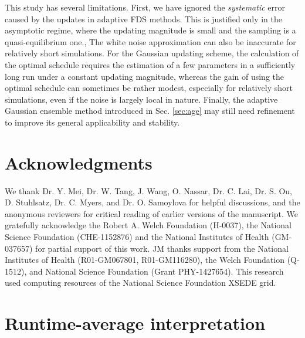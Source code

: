 \documentclass[reprint, superscriptaddress, floatfix]{revtex4-1}
\begin{document}
This study has several limitations.
%
First, we have ignored the \emph{systematic}
error\cite{zhou2005, morozov2007, zhou2008}
caused by the updates in adaptive FDS methods.
%
This is justified only in the asymptotic regime,
where the updating magnitude is small
and the sampling is a quasi-equilibrium one.\cite{
  zhou2005, morozov2007, zhou2008, barducci2008, dama2014},
%
The white noise approximation
can also be inaccurate for relatively short simulations.
%
For the Gaussian updating scheme,
the calculation of the optimal schedule requires
the estimation of a few parameters
in a sufficiently long run
under a constant updating magnitude,
whereas the gain of using the optimal schedule
can sometimes be rather modest,
especially for relatively short simulations,
even if the noise is largely local in nature.
%
Finally, the adaptive Gaussian ensemble method
introduced in Sec. \ref{sec:age} may still need refinement
to improve its general applicability and stability.


\section{Acknowledgments}

We thank Dr. Y. Mei, Dr. W. Tang, J. Wang,
O. Nassar, Dr. C. Lai, Dr. S. Ou, D. Stuhlsatz,
Dr. C. Myers, and Dr. O. Samoylova
for helpful discussions,
and the anonymous reviewers for critical reading
of earlier versions of the manuscript.
%
We gratefully acknowledge the Robert A. Welch Foundation (H-0037),
the National Science Foundation (CHE-1152876)
and the National Institutes of Health (GM-037657)
for partial support of this work.
%
JM thanks support from the National Institutes of Health
(R01-GM067801, R01-GM116280),
the Welch Foundation (Q-1512),
and National Science Foundation (Grant PHY-1427654).
%
This research used computing resources of
the National Science Foundation XSEDE grid.
%


\appendix




\section{\label{sec:equilerr}
Runtime-average interpretation
}
\end{document}
